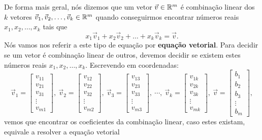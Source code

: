 \documentclass[../livro.tex]{subfiles}  %
\begin{document}
De forma mais geral, nós dizemos que um vetor $\vec{v} \in \mathbb{R}^m$ é combinação linear dos $k$ vetores $\vec{v}_1, \vec{v}_2, \dots, \vec{v}_k  \in \mathbb{R}^m$ quando conseguirmos encontrar números reais $x_1, x_2, \dots, x_k$ tais que
\[
x_1 \vec{v}_1 + x_2 \vec{v}_2 + \dots + x_k \vec{v}_k = \vec{v}.
\] Nós vamos nos referir a este tipo de equação por \textbf{equação vetorial}. Para decidir se um vetor é combinação linear de outros, devemos decidir se existem estes números reais $x_1, x_2, \dots, x_k$. Escrevendo em coordenadas:
\[
\vec{v}_1 =
\left[
  \begin{array}{c}
    v_{11} \\
    v_{21} \\
    v_{31} \\
    \vdots \\
    v_{m1}
  \end{array}
\right], \
\vec{v}_2 =
\left[
  \begin{array}{c}
    v_{12} \\
    v_{22} \\
    v_{32} \\
    \vdots \\
    v_{m2}
  \end{array}
\right], \
\vec{v}_3 =
\left[
  \begin{array}{c}
    v_{13} \\
    v_{23} \\
    v_{33} \\
    \vdots \\
    v_{m3}
  \end{array}
\right], \ \cdots, \
\vec{v}_k =
\left[
  \begin{array}{c}
    v_{1k} \\
    v_{2k} \\
    v_{3k} \\
    \vdots \\
    v_{mk}
  \end{array}
\right], \
\vec{v} =
\left[
  \begin{array}{c}
    b_{1} \\
    b_{2} \\
    b_{3} \\
    \vdots \\
    b_{m}
  \end{array}
\right],
\] vemos que encontrar os coeficientes da combinação linear, caso estes existam, equivale a resolver a equação vetorial
\end{document}
